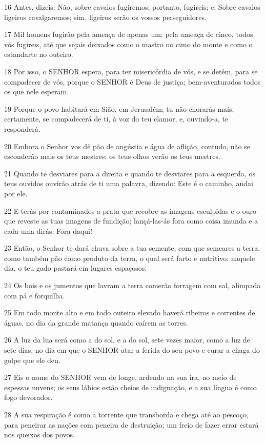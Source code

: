 \par 16 Antes, dizeis: Não, sobre cavalos fugiremos; portanto, fugireis; e: Sobre cavalos ligeiros cavalgaremos; sim, ligeiros serão os vossos perseguidores.
\par 17 Mil homens fugirão pela ameaça de apenas um; pela ameaça de cinco, todos vós fugireis, até que sejais deixados como o mastro no cimo do monte e como o estandarte no outeiro.
\par 18 Por isso, o SENHOR espera, para ter misericórdia de vós, e se detém, para se compadecer de vós, porque o SENHOR é Deus de justiça; bem-aventurados todos os que nele esperam.
\par 19 Porque o povo habitará em Sião, em Jerusalém; tu não chorarás mais; certamente, se compadecerá de ti, à voz do teu clamor, e, ouvindo-a, te responderá.
\par 20 Embora o Senhor vos dê pão de angústia e água de aflição, contudo, não se esconderão mais os teus mestres; os teus olhos verão os teus mestres.
\par 21 Quando te desviares para a direita e quando te desviares para a esquerda, os teus ouvidos ouvirão atrás de ti uma palavra, dizendo: Este é o caminho, andai por ele.
\par 22 E terás por contaminados a prata que recobre as imagens esculpidas e o ouro que reveste as tuas imagens de fundição; lançá-las-ás fora como coisa imunda e a cada uma dirás: Fora daqui!
\par 23 Então, o Senhor te dará chuva sobre a tua semente, com que semeares a terra, como também pão como produto da terra, o qual será farto e nutritivo; naquele dia, o teu gado pastará em lugares espaçosos.
\par 24 Os bois e os jumentos que lavram a terra comerão forragem com sal, alimpada com pá e forquilha.
\par 25 Em todo monte alto e em todo outeiro elevado haverá ribeiros e correntes de águas, no dia da grande matança quando caírem as torres.
\par 26 A luz da lua será como a do sol, e a do sol, sete vezes maior, como a luz de sete dias, no dia em que o SENHOR atar a ferida do seu povo e curar a chaga do golpe que ele deu.
\par 27 Eis o nome do SENHOR vem de longe, ardendo na sua ira, no meio de espessas nuvens; os seus lábios estão cheios de indignação, e a sua língua é como fogo devorador.
\par 28 A sua respiração é como a torrente que transborda e chega até ao pescoço, para peneirar as nações com peneira de destruição; um freio de fazer errar estará nos queixos dos povos.
